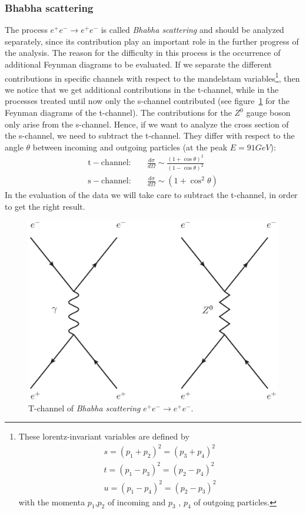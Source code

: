 \subsubsection{Bhabha scattering}
\label{sub:bhabha}
The process $e^+e^-\rightarrow e^+ e^-$ is called \textit{Bhabha scattering} and should be analyzed separately, since its
contribution play an important role in the further progress of the analysis. The reason for the difficulty in this process
is the occurrence of additional Feynman diagrams to be evaluated. If we separate the different contributions in specific  
channels with respect to the mandelstam variables\footnote{These lorentz-invariant variables are defined by 
\begin{align*}
s=(p_1+p_2)^2=(p_3+p_4)^2 \\
t=(p_1-p_3)^2=(p_2-p_4)^2 \\
u=(p_1-p_4)^2=(p_2-p_3)^2
\end{align*}
with the momenta $p_1$,$p_2$ of incoming and $p_3$ , $p_4$ of outgoing particles.
}, 
then we notice that we get additional contributions in the
t-channel, while in the processes treated until now only the s-channel contributed (see figure~\ref{fig:bhabha} for the
Feynman diagrams of the t-channel). The contributions for the $Z^0$ gauge boson only arise from the s-channel. Hence, if we
want to analyze the cross section of the s-channel, we need to subtract the t-channel. They differ with respect to the
angle $\theta$ between incoming and outgoing particles (at the peak $E=91GeV$):
\begin{align} 
  \mathrm{t-channel:}\quad    &\frac{d\sigma}{d\Omega} \sim \frac{(1+\cos\theta)^2}{(1-\cos \theta)^2}\\
  \mathrm{s-channel:}\quad    &\frac{d\sigma}{d\Omega} \sim (1+\cos^2\theta)
\end{align}
In the evaluation of the data we will take care to subtract the t-channel, in order to get the right result.

\begin{figure}[htpb]
    \centering
    \includegraphics[width=0.6\linewidth]{figures/bhabha}
    \caption{T-channel of \textit{Bhabha scattering} $e^+e^-\rightarrow e^+ e^-$.}
    \label{fig:bhabha}
\end{figure}

